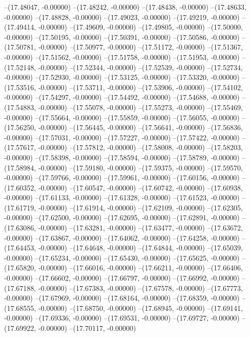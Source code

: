 --(17.48047, -0.00000)
--(17.48242, -0.00000)
--(17.48438, -0.00000)
--(17.48633, -0.00000)
--(17.48828, -0.00000)
--(17.49023, -0.00000)
--(17.49219, -0.00000)
--(17.49414, -0.00000)
--(17.49609, -0.00000)
--(17.49805, -0.00000)
--(17.50000, -0.00000)
--(17.50195, -0.00000)
--(17.50391, -0.00000)
--(17.50586, -0.00000)
--(17.50781, -0.00000)
--(17.50977, -0.00000)
--(17.51172, -0.00000)
--(17.51367, -0.00000)
--(17.51562, -0.00000)
--(17.51758, -0.00000)
--(17.51953, -0.00000)
--(17.52148, -0.00000)
--(17.52344, -0.00000)
--(17.52539, -0.00000)
--(17.52734, -0.00000)
--(17.52930, -0.00000)
--(17.53125, -0.00000)
--(17.53320, -0.00000)
--(17.53516, -0.00000)
--(17.53711, -0.00000)
--(17.53906, -0.00000)
--(17.54102, -0.00000)
--(17.54297, -0.00000)
--(17.54492, -0.00000)
--(17.54688, -0.00000)
--(17.54883, -0.00000)
--(17.55078, -0.00000)
--(17.55273, -0.00000)
--(17.55469, -0.00000)
--(17.55664, -0.00000)
--(17.55859, -0.00000)
--(17.56055, -0.00000)
--(17.56250, -0.00000)
--(17.56445, -0.00000)
--(17.56641, -0.00000)
--(17.56836, -0.00000)
--(17.57031, -0.00000)
--(17.57227, -0.00000)
--(17.57422, -0.00000)
--(17.57617, -0.00000)
--(17.57812, -0.00000)
--(17.58008, -0.00000)
--(17.58203, -0.00000)
--(17.58398, -0.00000)
--(17.58594, -0.00000)
--(17.58789, -0.00000)
--(17.58984, -0.00000)
--(17.59180, -0.00000)
--(17.59375, -0.00000)
--(17.59570, -0.00000)
--(17.59766, -0.00000)
--(17.59961, -0.00000)
--(17.60156, -0.00000)
--(17.60352, -0.00000)
--(17.60547, -0.00000)
--(17.60742, -0.00000)
--(17.60938, -0.00000)
--(17.61133, -0.00000)
--(17.61328, -0.00000)
--(17.61523, -0.00000)
--(17.61719, -0.00000)
--(17.61914, -0.00000)
--(17.62109, -0.00000)
--(17.62305, -0.00000)
--(17.62500, -0.00000)
--(17.62695, -0.00000)
--(17.62891, -0.00000)
--(17.63086, -0.00000)
--(17.63281, -0.00000)
--(17.63477, -0.00000)
--(17.63672, -0.00000)
--(17.63867, -0.00000)
--(17.64062, -0.00000)
--(17.64258, -0.00000)
--(17.64453, -0.00000)
--(17.64648, -0.00000)
--(17.64844, -0.00000)
--(17.65039, -0.00000)
--(17.65234, -0.00000)
--(17.65430, -0.00000)
--(17.65625, -0.00000)
--(17.65820, -0.00000)
--(17.66016, -0.00000)
--(17.66211, -0.00000)
--(17.66406, -0.00000)
--(17.66602, -0.00000)
--(17.66797, -0.00000)
--(17.66992, -0.00000)
--(17.67188, -0.00000)
--(17.67383, -0.00000)
--(17.67578, -0.00000)
--(17.67773, -0.00000)
--(17.67969, -0.00000)
--(17.68164, -0.00000)
--(17.68359, -0.00000)
--(17.68555, -0.00000)
--(17.68750, -0.00000)
--(17.68945, -0.00000)
--(17.69141, -0.00000)
--(17.69336, -0.00000)
--(17.69531, -0.00000)
--(17.69727, -0.00000)
--(17.69922, -0.00000)
--(17.70117, -0.00000)
